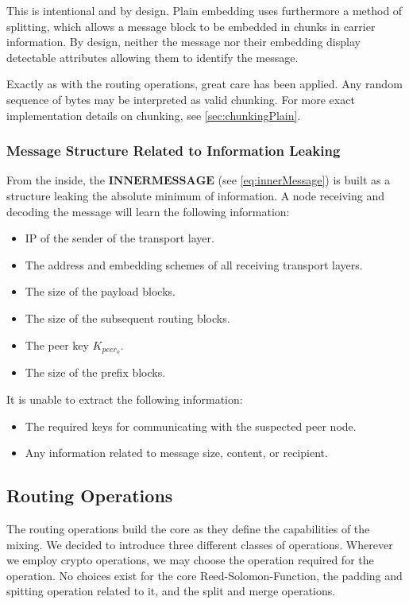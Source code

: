 This is intentional and by design. Plain embedding uses furthermore a method of splitting, which allows a message block to be embedded in chunks in carrier information. By design, neither the message nor their embedding display detectable attributes allowing them to identify the message. 

Exactly as with the routing operations, great care has been applied. Any random sequence of bytes may be interpreted as valid chunking. For more exact implementation details on chunking, see \cref{sec:chunkingPlain}.

\subsubsection{Message Structure Related to Information Leaking}
From the inside, the $\mathbf{INNERMESSAGE}$ (see \cref{eq:innerMessage}) is built as a structure leaking the absolute minimum of information. A node receiving and decoding the message will learn the following information:
\begin{itemize}
	\item IP of the sender of the transport layer.
	\item The address and embedding schemes of all receiving transport layers.
	\item The size of the payload blocks.
	\item The size of the subsequent routing blocks.
	\item The peer key $K_{peer_o}$.
	\item The size of the prefix blocks.
\end{itemize}

It is unable to extract the following information:
\begin{itemize}
	\item The required keys for communicating with the suspected peer node.
	\item Any information related to message size, content, or recipient.
\end{itemize}

\subsection{Routing Operations}\label{sec:operations}
The routing operations build the core as they define the capabilities of the mixing. We decided to introduce three different classes of operations. Wherever we employ crypto operations, we may choose the operation required for the operation. No choices exist for the core Reed-Solomon-Function, the padding and spitting operation related to it, and the split and merge operations.

